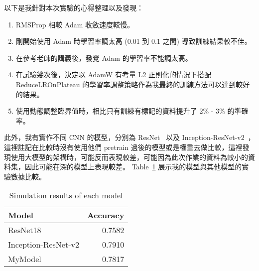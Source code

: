 \documentclass[a4paper,12pt]{article}   %
\begin{document}
以下是我針對本次實驗的心得整理以及發現：
\begin{enumerate}[label=\textbf{\arabic*.}]
\item   RMSProp 相較 Adam 收斂速度較慢。
\item	剛開始使用 Adam 時學習率調太高 (0.01 到 0.1 之間) 導致訓練結果較不佳。
\item	在參考老師的講義後，發覺 Adam 的學習率不能調太高。
\item	在試驗幾次後，決定以 AdamW 有考量 L2 正則化的情況下搭配 ReduceLROnPlateau 的學習率調整策略作為我最終的訓練方法可以達到較好的結果。
\item   使用動態調整臨界值時，相比只有訓練有標記的資料提升了 2\% - 3\% 的準確率。

\end{enumerate}


此外，我有實作不同 CNN 的模型，分別為 ResNet\ \cite{he2015deep} 以及 Inception-ResNet-v2\ \cite{szegedy2016inceptionv4}，這裡註記在比較時沒有使用他們 pretrain 過後的模型或是權重去做比較，這裡發現使用大模型的架構時，可能反而表現較差，可能因為此次作業的資料為較小的資料集，因此可能在深的模型上表現較差。 Table\ \ref{table:comparison} 展示我的模型與其他模型的實驗數據比較。

\begin{table}[htb]
	\centering	
	\normalsize
    \newcommand{\z}{\phantom{0}}
    \caption{Simulation results of each model}
    \vspace{0.15\baselineskip}
	\begin{tabularx}{0.6\textwidth}{@{}lr@{}}\toprule
		\textbf{Model} & \textbf{Accuracy} \\
		\hline
		ResNet18 & 0.7582  \\ 
		Inception-ResNet-v2  & 0.7910  \\
		MyModel & 0.7817  \\
    		\hline

	\end{tabularx}
	\label{table:comparison}
   \vspace{0.15\baselineskip}
\end{table}








 

\end{document}
